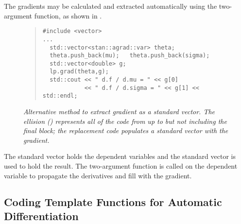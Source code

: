 \documentclass[10pt]{article}
\begin{document}
The gradients may be calculated and extracted automatically using the
two-argument  function, as shown in
.
%
\begin{figure}
\vspace*{-12pt}
\begin{quote}\small
\begin{Verbatim}
#include <vector>
...
  std::vector<stan::agrad::var> theta;
  theta.push_back(mu);   theta.push_back(sigma);
  std::vector<double> g;
  lp.grad(theta,g);
  std::cout << " d.f / d.mu = " << g[0]
            << " d.f / d.sigma = " << g[1] << std::endl;
\end{Verbatim}
\end{quote}
\vspace*{-12pt}
\caption{\small\it Alternative method to extract gradient as a
  standard vector.  The ellision () represents all of the
  code from  up to but not
  including the final block; the replacement code populates a standard
  vector with the gradient.}\label{normal-log-gradient-cpp-2.figure}
\end{figure}
%
The standard vector  holds the dependent variables and the
standard vector  is used to hold the result.  The two-argument
 function is called on the dependent variable to propagate
the derivatives and fill  with the gradient.

\subsection{Coding Template Functions for Automatic Differentiation}
\end{document}
